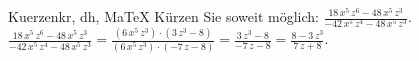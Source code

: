 \begin{MAufgabe}{Kuerzen}{kr, dh, MaTeX}
K\"urzen Sie soweit m\"oglich: $\frac{18\, x^5\, z^6 - 48\, x^5\, z^3}{ - 42\, x^5\, z^4 - 48\, x^5\, z^3}$.\\ 
\ifLsg\MLoesung
\quad $\frac{18\, x^5\, z^6 - 48\, x^5\, z^3}{ - 42\, x^5\, z^4 - 48\, x^5\, z^3}=\frac{(6\, x^5\, z^3)\cdot(3\, z^3 - 8)}{(6\, x^5\, z^3)\cdot( - 7\, z - 8)}=\frac{3\, z^3 - 8}{ - 7\, z - 8}=\frac{8 - 3\, z^3}{7\, z + 8}$.\else\relax\fi
 \end{MAufgabe}